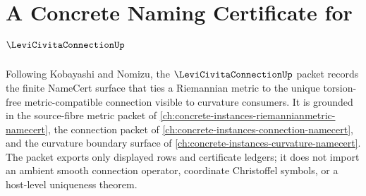 \chapter{A Concrete Naming Certificate for $\LeviCivitaConnectionUp$}
\label{ch:concrete-instances-levi-civita-connection-namecert}

Following Kobayashi and Nomizu, the $\LeviCivitaConnectionUp$ packet records the finite NameCert surface that ties a Riemannian metric to the unique torsion-free metric-compatible connection visible to curvature consumers. It is grounded in the source-fibre metric packet of \autoref{ch:concrete-instances-riemannianmetric-namecert}, the connection packet of \autoref{ch:concrete-instances-connection-namecert}, and the curvature boundary surface of \autoref{ch:concrete-instances-curvature-namecert}. The packet exports only displayed rows and certificate ledgers; it does not import an ambient smooth connection operator, coordinate Christoffel symbols, or a host-level uniqueness theorem.

